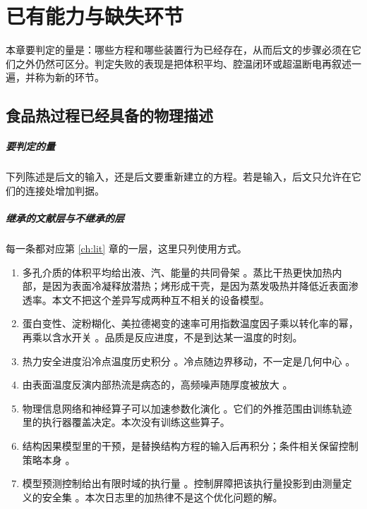 \chapter{已有能力与缺失环节}

本章要判定的量是：哪些方程和哪些装置行为已经存在，从而后文的步骤必须在它们之外仍然可区分。判定失败的表现是把体积平均、腔温闭环或超温断电再叙述一遍，并称为新的环节。

\section{食品热过程已经具备的物理描述}

\paragraph{要判定的量}
下列陈述是后文的输入，还是后文要重新建立的方程。若是输入，后文只允许在它们的连接处增加判据。

\paragraph{继承的文献层与不继承的层}
每一条都对应第 \ref{ch:lit} 章的一层，这里只列使用方式。

\begin{enumerate}
\item 多孔介质的体积平均给出液、汽、能量的共同骨架 \cite{whitaker1977,datta2007}。蒸比干热更快加热内部，是因为表面冷凝释放潜热；烤形成干壳，是因为蒸发吸热并降低近表面渗透率。本文不把这个差异写成两种互不相关的设备模型。
\item 蛋白变性、淀粉糊化、美拉德褐变的速率可用指数温度因子乘以转化率的幂，再乘以含水开关 \cite{vanboekel2008}。品质是反应进度，不是到达某一温度的时刻。
\item 热力安全进度沿冷点温度历史积分 \cite{holdsworth1997}。冷点随边界移动，不一定是几何中心 \cite{feyissa2013}。
\item 由表面温度反演内部热流是病态的，高频噪声随厚度被放大 \cite{ozisik2000}。
\item 物理信息网络和神经算子可以加速参数化演化 \cite{raissi2019,li2021fno,lu2021deeponet}。它们的外推范围由训练轨迹里的执行器覆盖决定。本次没有训练这些算子。
\item 结构因果模型里的干预，是替换结构方程的输入后再积分；条件相关保留控制策略本身 \cite{pearl2009}。
\item 模型预测控制给出有限时域的执行量 \cite{rawlings2017}。控制屏障把该执行量投影到由测量定义的安全集 \cite{ames2017cbf}。本次日志里的加热律不是这个优化问题的解。
\end{enumerate}

